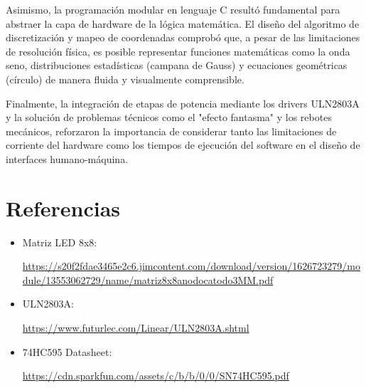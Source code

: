 Asimismo, la programación modular en lenguaje C resultó fundamental para abstraer la capa de hardware de la lógica matemática. El diseño del algoritmo de discretización y mapeo de coordenadas comprobó que, a pesar de las limitaciones de resolución física, es posible representar funciones matemáticas como la onda seno, distribuciones estadísticas (campana de Gauss) y ecuaciones geométricas (círculo) de manera fluida y visualmente comprensible. 

Finalmente, la integración de etapas de potencia mediante los drivers ULN2803A y la solución de problemas técnicos como el "efecto fantasma" y los rebotes mecánicos, reforzaron la importancia de considerar tanto las limitaciones de corriente del hardware como los tiempos de ejecución del software en el diseño de interfaces humano-máquina.

\section{Referencias}

\begin{itemize}

\item Matriz LED 8x8:

\url{https://s20f2fdae3465e2c6.jimcontent.com/download/version/1626723279/module/13553062729/name/matriz8x8anodocatodo3MM.pdf}

\item ULN2803A:

\url{https://www.futurlec.com/Linear/ULN2803A.shtml}

\item 74HC595 Datasheet:

\url{https://cdn.sparkfun.com/assets/c/b/b/0/0/SN74HC595.pdf}

\end{itemize}
